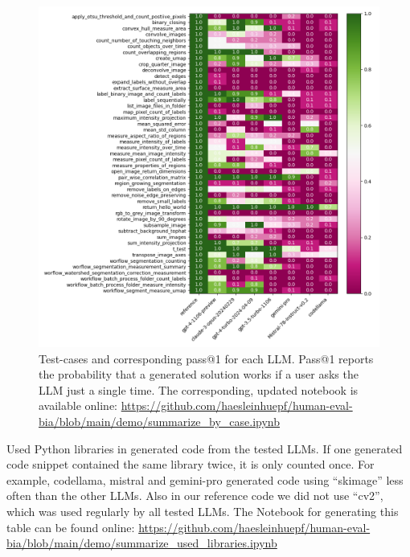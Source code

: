 \documentclass{ecai}
\begin{document}
\begin{figure}[h]
\centering
\includegraphics[width=\textwidth]{performance_per_task.png}
\caption{Test-cases  and corresponding pass@1 for each LLM. Pass@1 reports the probability that a generated solution works if a user asks the LLM just a single time. The corresponding, updated notebook is available online:
\url{https://github.com/haesleinhuepf/human-eval-bia/blob/main/demo/summarize_by_case.ipynb}
\newline
\newline
}
\label{fig:performancepertask}
\end{figure}


\begin{table}[h]

\caption{Used Python libraries in generated code from the tested LLMs. If one generated code snippet contained the same library twice, it is only counted once. For example, codellama, mistral and gemini-pro generated code using “skimage” less often than the other LLMs. Also in our reference code we did not use “cv2”, which was used regularly by all tested LLMs. The Notebook for generating this table can be found online: \url{https://github.com/haesleinhuepf/human-eval-bia/blob/main/demo/summarize_used_libraries.ipynb} }
\label{tab:usedlibraries}
\end{table}
\end{document}
